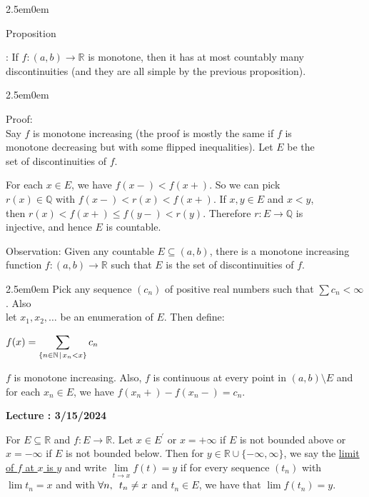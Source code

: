 \documentclass{book}
\newcommand{\hThree}{%
   \color{PineGreen}
   \fontsize{13}{15}\selectfont%
}
\newcommand{\exOne}{%
   \color{Purple}%
   \fontsize{14}{16}\selectfont%
}
\newcommand{\exTwo}{%
   \color{RedViolet}%
   \fontsize{13}{15}\selectfont%
}
\newenvironment{myIndent}{%
   \begin{adjustwidth}{2.5em}{0em}%
}{%
   \end{adjustwidth}%
}
\newcommand{\udefine}[1]{%
   \setulcolor{Red}%
   \setul{0.14em}{0.07em}%
   \ul{#1}%
}
\newcommand{\retTwo}{\hfill\bigbreak}
\newcounter{LectureNumber}
\newcommand*{\markLecture}[1]{%
   \stepcounter{LectureNumber}%
   {\huge \color{Black} \textbf{Lecture \theLectureNumber: #1} \newline}%
}
\newcommand{\myHS}{ \hspace{0.5em}}
\newcounter{PropNumber}
\newcommand{\propCount}[1][1]{%
   \addtocounter{PropNumber}{#1}%
   \thePropNumber%
}
\begin{document}
{\begin{myIndent}
      Proposition \propCount: If $f: (a, b) \rightarrow \mathbb{R}$ is monotone, then it has at most countably many discontinuities (and they are all simple by the previous proposition).
      {\begin{myIndent} \hThree
         Proof:\\
         Say $f$ is monotone increasing (the proof is mostly the same if $f$ is\\ monotone decreasing but with some flipped inequalities). Let $E$ be the\\ set of discontinuities of $f$.\retTwo

         For each $x \in E$, we have $f(x-) < f(x+)$. So we can pick\\ $r(x) \in \mathbb{Q}$ with $f(x-) < r(x) < f(x+)$. If $x, y \in E$ and $x < y$,\\ then $r(x) < f(x+) \leq f(y-) < r(y)$. Therefore $r: E \rightarrow \mathbb{Q}$ is\\ injective, and hence $E$ is countable. \retTwo
      \end{myIndent}}

      \exOne%
      Observation: Given any countable $E \subseteq (a, b)$, there is a monotone increasing function $f: (a, b) \rightarrow \mathbb{R}$ such that $E$ is the set of discontinuities of $f$.
      \begin{myIndent}\exTwo%
         Pick any sequence $(c_n)$ of positive real numbers such that $\sum c_n < \infty$. Also\\ let $x_1, x_2, \ldots$ be an enumeration of $E$. Then define:

         {\centering $f(x) = {\displaystyle \sum_{\{n \in \mathbb{N} \hspace{0.1em} \mid \hspace{0.1em} x_n < x\}}{c_n}}$ \retTwo\par}

         $f$ is monotone increasing. Also, $f$ is continuous at every point in $(a, b) \setminus E$ and for each $x_n \in E$, we have $f(x_n +) - f(x_n -) = c_n$.
      \end{myIndent}
   \end{myIndent}}
   
   \newpage

   \markLecture{3/15/2024}

   For $E \subseteq \mathbb{R}$ and $f: E \rightarrow \mathbb{R}$. Let $x \in E^\prime$ or $x = +\infty$ if $E$ is not bounded above or $x = -\infty$ if $E$ is not bounded below. Then for $y \in \mathbb{R} \cup \{-\infty, \infty\}$, we say the \udefine{limit of $f$ at $x$ is $y$} and write $\lim\limits_{t\rightarrow x}f(t) = y$ if for every sequence $(t_n)$ with $\lim{t_n} = x$ and with $\forall n, \myHS t_n \neq x$ and $t_n \in E$, we have that $\lim{f(t_n)} = y$. \retTwo
\end{document}
